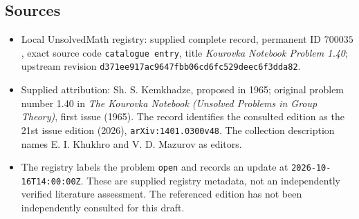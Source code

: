 \documentclass[11pt]{article}
\begin{document}
\subsection{Sources}
\begin{itemize}
\item Local UnsolvedMath registry: supplied complete record, permanent ID \(700035\), exact source code \texttt{catalogue entry}, title \emph{Kourovka Notebook Problem 1.40}; upstream revision \texttt{d371ee917ac9647fbb06cd6fc529deec6f3dda82}.
\item Supplied attribution: Sh. S. Kemkhadze, proposed in 1965; original problem number 1.40 in \emph{The Kourovka Notebook (Unsolved Problems in Group Theory)}, first issue (1965). The record identifies the consulted edition as the 21st issue edition (2026), \texttt{arXiv:1401.0300v48}. The collection description names E. I. Khukhro and V. D. Mazurov as editors.
\item The registry labels the problem \texttt{open} and records an update at \texttt{2026-10-16T14:00:00Z}. These are supplied registry metadata, not an independently verified literature assessment. The referenced edition has not been independently consulted for this draft.
\end{itemize}
\end{document}
